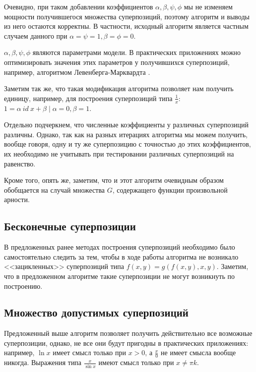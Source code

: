 \documentclass[12pt,a4paper]{amsart}
\begin{document}
Очевидно, при таком добавлении коэффициентов $\alpha, \beta, \psi, \phi$
мы не изменяем мощности получившегося множества суперпозиций, поэтому
алгоритм и выводы из него остаются корректны. В частности, исходный алгоритм
является частным случаем данного при
$\alpha = \psi = 1, \beta = \phi = 0$.

$\alpha, \beta, \psi, \phi$ являются параметрами модели. В практических
приложениях можно оптимизировать значения этих параметров у получившихся
суперпозиций, например, алгоритмом Левенберга-Марквардта
\cite{Marquardt1963Algorithm} \cite{more:78}.

Заметим так же, что такая модификация алгоритма позволяет нам получить единицу,
например, для построения суперпозиций типа $\frac{1}{x}$:
$1 = \alpha\ id\ x + \beta \mid \alpha = 0, \beta = 1$.

Отдельно подчеркнем, что численные коэффициенты у различных суперпозиций
различны. Однако, так как на разных итерациях алгоритма мы можем получить,
вообще говоря, одну и ту же суперпозицию с точностью до этих коэффициентов,
их необходимо не учитывать при тестировании различных суперпозиций на
равенство.

Кроме того, опять же, заметим, что и этот алгоритм очевидным образом
обобщается на случай множества $G$, содержащего функции произвольной арности.

\subsection{Бесконечные суперпозиции}

В предложенных ранее методах\cite{Zelinka2008} построения суперпозиций
необходимо было самостоятельно следить за тем, чтобы в ходе работы алгоритма
не возникало <<зацикленных>> суперпозиций типа $f(x, y) = g (f(x, y), x, y)$.
Заметим, что в предложенном алгоритме такие суперпозиции не могут возникнуть
по построению.

\subsection{Множество допустимых суперпозиций}

Предложенный выше алгоритм позволяет получить действительно все возможные
суперпозиции, однако, не все они будут пригодны в практических приложениях:
например, $\ln x$ имеет смысл только при $x > 0$, а $\frac{x}{0}$ не имеет
смысла вообще никогда. Выражения типа $\frac{x}{\sin x}$ имеют смысл только
при $x \neq \pi k$.
\end{document}
